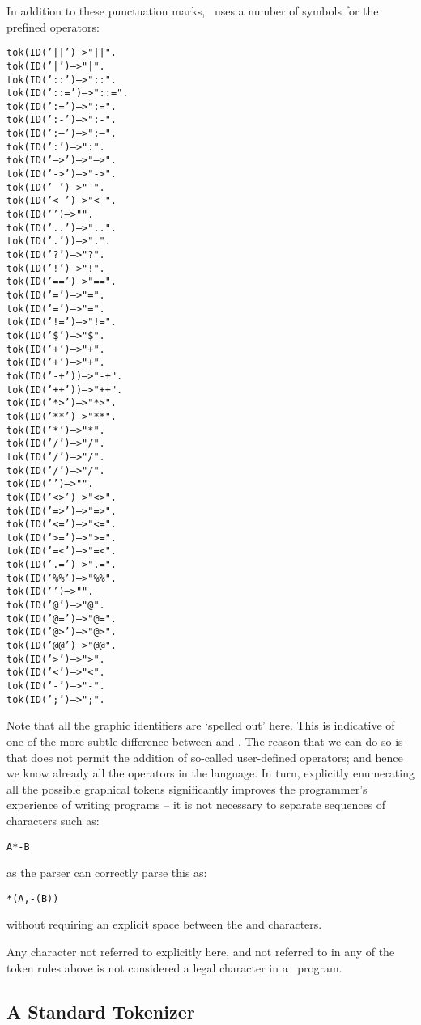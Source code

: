 In addition to these punctuation marks, \go\ uses a number of symbols for the prefined operators:
\begin{alltt}
tok(ID('||') --> "||".
tok(ID('|') --> "|".
tok(ID('::') --> "::".
tok(ID('::=') --> "::=".
tok(ID(':=') --> ":=".
tok(ID(':-') --> ":-".
tok(ID(':--') --> ":--".
tok(ID(':') --> ":".
tok(ID('-->') --> "-->".
tok(ID('->') --> "->".
tok(ID('~') --> "~".
tok(ID('<~') --> "<~".
tok(ID('\uphat{}') --> "\uphat{}".
tok(ID('..') --> "..".
tok(ID('.')) --> ".".
tok(ID('?') --> "?".
tok(ID('!') --> "!".
tok(ID('==') --> "==".
tok(ID('=') --> "=".
tok(ID('\bsl\bsl=') --> "\bsl\bsl=".
tok(ID('!=') --> "!=".
tok(ID('\$') --> "\$".
tok(ID('\bsl\bsl+') --> "\bsl\bsl+".
tok(ID('+') --> "+".
tok(ID('-+')) --> "-+".
tok(ID('++')) --> "++".
tok(ID('*>') --> "*>".
tok(ID('**') --> "**".
tok(ID('*') --> "*".
tok(ID('/') --> "/".
tok(ID('\bsl\bsl/') --> "\bsl\bsl/".
tok(ID('/\bsl\bsl') --> "/\bsl\bsl".
tok(ID('\bsl\bsl') --> "\bsl\bsl".
tok(ID('<>') --> "<>".
tok(ID('=>') --> "=>".
tok(ID('<=') --> "<=".
tok(ID('>=') --> ">=".
tok(ID('=<') --> "=<".
tok(ID('.=') --> ".=".
tok(ID('\%\%') --> "\%\%".
tok(ID('\hash') --> "\hash".
tok(ID('@') --> "@".
tok(ID('@=') --> "@=".
tok(ID('@>') --> "@>".
tok(ID('@@') --> "@@".
tok(ID('>') --> ">".
tok(ID('<') --> "<".
tok(ID('-') --> "-".
tok(ID(';') --> ";".
\end{alltt}
Note that all the graphic identifiers are `spelled out' here. This is indicative of one of the more subtle difference between \go and \prolog. The reason that we can do so is that \go does not permit the addition of so-called user-defined operators; and hence we know already all the operators in the language. In turn, explicitly enumerating all the possible graphical tokens significantly improves the programmer's experience of writing \go programs -- it is not necessary to separate sequences of characters such as:
\begin{alltt}
A*-B
\end{alltt}
as the \go parser can correctly parse this as:
\begin{alltt}
*(A,-(B))
\end{alltt}
without requiring an explicit space between the \q{*} and \q{-} characters.

Any character not referred to explicitly here, and not referred to in any of the token rules above is not considered a legal character in a \go\ program.

\subsection{A Standard Tokenizer}

